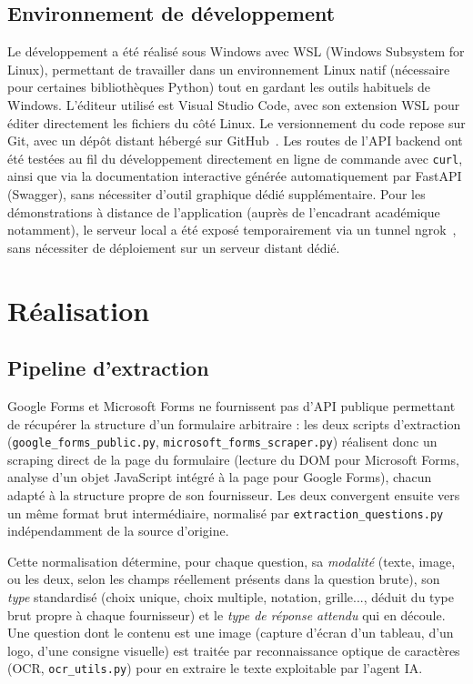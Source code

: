 \documentclass[12pt,a4paper]{report}
\begin{document}
\section{Environnement de développement}

Le développement a été réalisé sous Windows avec WSL (Windows Subsystem
for Linux), permettant de travailler dans un environnement Linux natif
(nécessaire pour certaines bibliothèques Python) tout en gardant les
outils habituels de Windows. L'éditeur utilisé est Visual Studio Code,
avec son extension WSL pour éditer directement les fichiers du côté
Linux. Le versionnement du code repose sur Git, avec un dépôt distant
hébergé sur GitHub~\cite{depot}.
Les routes de l'API backend ont été testées au fil
du développement directement en ligne de commande avec \texttt{curl},
ainsi que via la documentation interactive générée automatiquement par
FastAPI (Swagger), sans nécessiter d'outil graphique dédié supplémentaire.
Pour les démonstrations à distance de l'application (auprès de
l'encadrant académique notamment), le serveur local a été exposé
temporairement via un tunnel ngrok~\cite{ngrok}, sans nécessiter de
déploiement sur un serveur distant dédié.

\chapter{Réalisation}

\section{Pipeline d'extraction}

Google Forms et Microsoft Forms ne fournissent pas d'API publique
permettant de récupérer la structure d'un formulaire arbitraire : les
deux scripts d'extraction (\texttt{google\_forms\_public.py},
\texttt{microsoft\_forms\_scraper.py})
réalisent donc un scraping direct
de la page du formulaire (lecture du DOM pour Microsoft Forms, analyse
d'un objet JavaScript intégré à la page pour Google Forms), chacun
adapté à la structure propre de son fournisseur. Les deux convergent
ensuite vers un même format brut intermédiaire, normalisé par
\texttt{extraction\_questions.py} indépendamment de la source
d'origine.

Cette normalisation détermine, pour chaque question, sa \emph{modalité}
(texte, image, ou les deux, selon les champs réellement présents dans
la question brute), son \emph{type} standardisé (choix unique, choix
multiple, notation, grille..., déduit du type brut propre à chaque
fournisseur) et le \emph{type de réponse attendu} qui en découle. Une
question dont le contenu est une image (capture d'écran d'un tableau,
d'un logo, d'une consigne visuelle) est traitée par reconnaissance
optique de caractères (OCR, \texttt{ocr\_utils.py}) pour en extraire le
texte exploitable par l'agent IA.
\end{document}
